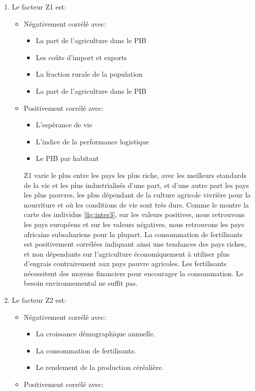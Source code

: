 	\begin{enumerate}
	\item Le facteur Z1 est:\begin{itemize}
		\item Négativement corrélé avec:\begin{itemize}
		\item La part de l'agriculture dans le PIB
		\item Les coûts d'import et exports
		\item La fraction rurale de la population
		\item La part de l'agriculture dans le PIB
		\end{itemize}
		\item Positivement corrélé avec:\begin{itemize}
		\item L'espèrance de vie
		\item L'indice de la performance logistique
		\item Le PIB par habitant
		\end{itemize}
		Z1 varie le plus entre les pays les plus riche, avec les meilleurs standards de la vie et les plus industrialisés d'une part, et d'une autre part les pays les plus pauvres, les plus dépendant de la culture agricole vivrière pour la nourriture et où les conditions de vie sont très durs. Comme le montre la carte des individus \ref{fig:inter3}, sur les valeurs positives, nous retrouvons les pays européens et sur les valeurs négatives, nous retrouvons les pays africains subsahariens pour la plupart. La consommation de fertilisants est positivement corrélées indiquant ainsi une tendances des pays riches, et non dépendants sur l'agriculture économiquement à utiliser plus d'engrais contrairement aux pays pauvre agricoles. Les fertilisants nécessitent des moyens financiers pour encourager la consommation. Le besoin environnemental ne suffit pas.
	\end{itemize}
	\item Le facteur Z2 est:\begin{itemize}
		\item Négativement corrélé avec:\begin{itemize}
		\item La croissance démographique annuelle.
		\item La consommation de fertilisants.
		\item Le rendement de la production céréalière.
		\end{itemize}
		\item Positivement corrélé avec:\begin{itemize}

\end{itemize}
\end{itemize}
\end{enumerate}
